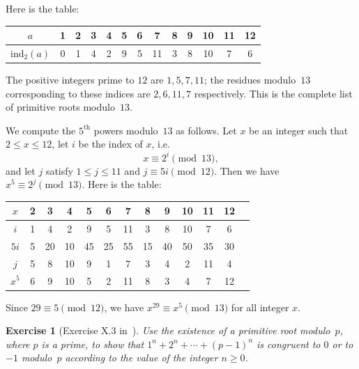 \documentclass[12pt,letterpaper]{article}
\newtheorem{exer}[thm]{Exercise}
\theoremstyle{definition}
\begin{document}
Here is the table:

\begin{table}[htbp] %
\centering
\begin{tabular}{|c|c|c|c|c|c|c|c|c|c|c|c|c|}
\hline
$a$ & 1 & 2 & 3 & 4 & 5 & 6 & 7 & 8 & 9 & 10 & 11 & 12 \\ \hline
$\text{ind}_2(a)$ & 0 & 1 & 4 & 2 & 9 & 5 & 11 & 3 & 8 & 10 & 7 & 6 \\ \hline
\end{tabular}
\end{table}

The positive integers prime to $12$ are $1,5,7,11$; the residues modulo~$13$ corresponding to these indices are $2,6,11,7$ respectively. This is the complete list of primitive roots modulo~$13$. 

We compute the $5^{\text{th}}$ powers modulo~$13$ as follows. Let $x$ be an integer such that $2\le x\le 12$, let $i$ be the index of $x$, i.e. 
$$
x\equiv 2^i\pmod{13},
$$ 
and let $j$ satisfy $1\le j\le 11$ and $j\equiv 5i \pmod{12}$. Then we have $x^5\equiv 2^j\pmod{13}$. Here is the table: 

\begin{table}[htbp] 
\centering
\begin{tabular}{|c|c|c|c|c|c|c|c|c|c|c|c|c|}
\hline
$x$   & 2 &  3 &  4 &  5 &  6 &  7 &  8 &  9 & 10 & 11 & 12 \\ \hline
$i$   & 1 &  4 &  2 &  9 &  5 & 11 &  3 &  8 & 10 &  7 &  6 \\ \hline
$5i$  & 5 & 20 & 10 & 45 & 25 & 55 & 15 & 40 & 50 & 35 & 30 \\ \hline
$j$   & 5 &  8 & 10 &  9 &  1 &  7 &  3 &  4 &  2 & 11 &  4 \\ \hline
$x^5$ & 6 &  9 & 10 &  5 &  2 & 11 &  8 &  3 &  4 &  7 & 12 \\ \hline
\end{tabular}
\end{table} 

Since $29 \equiv 5 \pmod{12}$, we have $x^{29} \equiv x^5 \pmod{13}$ for all integer $x$. 

\begin{exer}[Exercise X.3 in~\cite{weil1979}]
Use the existence of a primitive root modulo~$p$, where $p$ is a prime, to show that $1^n+2^n+\cdots+(p-1)^n$ is congruent to $0$ or to $-1$ modulo~$p$ according to the value of the integer $n\ge 0$.
\end{exer}
\end{document}
